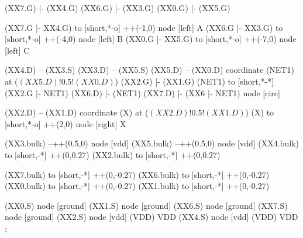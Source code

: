 \begin{circuitikz}[american]

	(XX7.G) |- (XX4.G)
	(XX6.G) |- (XX3.G)
	(XX0.G) |- (XX5.G)
	
	(XX7.G |- XX4.G) to [short,*-o] ++(-1,0) node [left] {A}
	(XX6.G |- XX3.G) to [short,*-o] ++(-4,0) node [left] {B}
	(XX0.G |- XX5.G) to [short,*-o] ++(-7,0) node [left] {C}
	
	(XX4.D) -- (XX3.S)
	(XX3.D) -- (XX5.S)
	(XX5.D) -- (XX0.D)
	coordinate (NET1) at ($(XX5.D)!0.5!(XX0.D)$)
	(XX2.G) |- (XX1.G)
	(NET1) to [short,*-*] (XX2.G |- NET1) 
	(XX6.D) |- (NET1)
	(XX7.D) |- (XX6 |- NET1) node [circ] {} 
	
	(XX2.D) -- (XX1.D)
	coordinate (X) at ($(XX2.D)!0.5!(XX1.D)$)
	(X) to [short,*-o] ++(2,0) node [right] {X}
	
	(XX3.bulk) --++(0.5,0) node [vdd]{}
	(XX5.bulk) --++(0.5,0) node [vdd]{}
	(XX4.bulk) to [short,-*] ++(0,0.27)
	(XX2.bulk) to [short,-*] ++(0,0.27)
	
	(XX7.bulk) to [short,-*] ++(0,-0.27)
	(XX6.bulk) to [short,-*] ++(0,-0.27)
	(XX0.bulk) to [short,-*] ++(0,-0.27)
	(XX1.bulk) to [short,-*] ++(0,-0.27)


	(XX0.S) node [ground] {}
	(XX1.S) node [ground] {}
	(XX6.S) node [ground] {}
	(XX7.S) node [ground] {}
	(XX2.S) node [vdd] (VDD) {VDD}
	(XX4.S) node [vdd] (VDD) {VDD}
;

\end{circuitikz}
